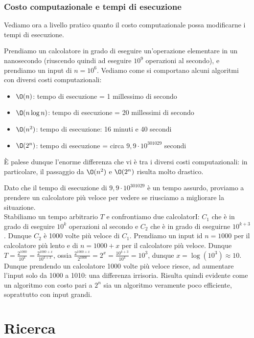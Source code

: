 \documentclass[11pt, a4paper, titlepage, oneside]{scrbook}
\begin{document}
\subsection{Costo computazionale e tempi di esecuzione}

Vediamo ora a livello pratico quanto il costo computazionale possa modificarne i tempi di esecuzione. 

Prendiamo un calcolatore in grado di eseguire un'operazione elementare in un nanosecondo (riuscendo quindi ad eseguire $10^9$ operazioni al secondo), e prendiamo un input di $n = 10^6$. Vediamo come si comportano alcuni algoritmi con diversi costi computazionali:
\begin{itemize}
    \item $\O(n)$: tempo di esecuzione = 1 millessimo di secondo
    \item $\O(n \log n)$: tempo di esecuzione = 20 millessimi di secondo
    \item $\O(n^2)$: tempo di esecuzione: 16 minuti e 40 secondi
    \item $\O(2^n)$: tempo di esecuzione = circa $9,9 \cdot 10^{301029}$ secondi
\end{itemize}

È palese dunque l'enorme differenza che vi è tra i diversi costi computazionali: in particolare, il passaggio da $\O(n^2)$ e $\O(2^n)$ risulta molto drastico. 

Dato che il tempo di esecuzione di $9,9 \cdot 10^{301029}$ è un tempo assurdo, proviamo a prendere un calcolatore più veloce per vedere se riusciamo a migliorare la situazione. \\
Stabiliamo un tempo arbitrario $T$ e confrontiamo due calcolatorI: $C_1$ che è in grado di eseguire $10^k$ operazioni al secondo e $C_2$ che è in grado di eseguirne $10^{k+3}$. Dunque $C_2$ è 1000 volte più veloce di $C_1$. Prendiamo un input id $n = 1000$ per il calcolatore più lento e di $n = 1000 + x$ per il calcolatore più veloce. Dunque \mbox{$T = \frac{2^{1000}}{10^k} = \frac{2^{1000+x}}{10^{k+3}}$}, ossia $\frac{2^{1000 + x}}{2^{1000}} = 2^x = \frac{10^{k+3}}{10^k} = 10^3$, dunque $x = \log (10^3) \approx 10$. Dunque prendendo un calcolatore 1000 volte più veloce riesce, ad aumentare l'input solo da 1000 a 1010: una differenza irrisoria. Risulta quindi evidente come un algoritmo con costo pari a $2^n$ sia un algoritmo veramente poco efficiente, soprattutto con input grandi. 
 

\chapter{Ricerca}
\end{document}
